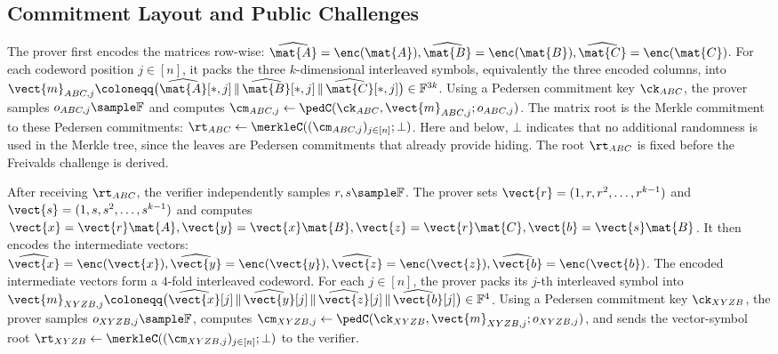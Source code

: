 \subsection{Commitment Layout and Public Challenges}
\label{sec:commitment-challenge}

The prover first encodes the matrices row-wise:
{\footnotesize
\(\widehat{\mat{A}}=\enc(\mat{A}),
  \widehat{\mat{B}}=\enc(\mat{B}),
  \widehat{\mat{C}}=\enc(\mat{C})\).
}
For each codeword position \(j\in[n]\), it packs the three \(k\)-dimensional
interleaved symbols, equivalently the three encoded columns, into
{\footnotesize
\(\vect{m}_{ABC,j}
  \coloneqq
  \big(
    \widehat{\mat{A}}[*,j]\,
    \|\,\widehat{\mat{B}}[*,j]\,
    \|\,\widehat{\mat{C}}[*,j]
  \big)
  \in\mathbb{F}^{3k}\).
}
Using a Pedersen commitment key \(\ck_{ABC}\), the prover samples
\(o_{ABC,j}\sample\mathbb{F}\) and computes
{\footnotesize
\(\cm_{ABC,j}
  \gets
  \pedC(\ck_{ABC},\vect{m}_{ABC,j};o_{ABC,j})\).
}
The matrix root is the Merkle commitment to these Pedersen commitments:
{\footnotesize
\(\rt_{ABC}
  \gets
  \merkleC((\cm_{ABC,j})_{j\in[n]};\bot)\).
}
Here and below, \(\bot\) indicates that no additional randomness is used in the
Merkle tree, since the leaves are Pedersen commitments that already provide
hiding. The root \(\rt_{ABC}\) is fixed before the Freivalds challenge is
derived.

After receiving \(\rt_{ABC}\), the verifier independently samples
\(r,s\sample\mathbb{F}\).  The prover sets
{\footnotesize
\(\vect{r}=(1,r,r^2,\ldots,r^{k-1})\) and
\(\vect{s}=(1,s,s^2,\ldots,s^{k-1})\)}
and computes
{\footnotesize
\(\vect{x}=\vect{r}\mat{A},
  \vect{y}=\vect{x}\mat{B},
  \vect{z}=\vect{r}\mat{C},
  \vect{b}=\vect{s}\mat{B}\).
}
It then encodes the intermediate vectors:
{\footnotesize
\(\widehat{\vect{x}}=\enc(\vect{x}),
  \widehat{\vect{y}}=\enc(\vect{y}),
  \widehat{\vect{z}}=\enc(\vect{z}),
  \widehat{\vect{b}}=\enc(\vect{b})\).
}
The encoded intermediate vectors form a \(4\)-fold interleaved codeword.  For
each \(j\in[n]\), the prover packs its \(j\)-th interleaved symbol into
{\footnotesize
\(\vect{m}_{XYZB,j}
  \coloneqq
  \big(
    \widehat{\vect{x}}[j]\,
    \|\,\widehat{\vect{y}}[j]\,
    \|\,\widehat{\vect{z}}[j]\,
    \|\,\widehat{\vect{b}}[j]
  \big)
  \in\mathbb{F}^{4}\).
}
Using a Pedersen commitment key \(\ck_{XYZB}\), the prover samples
\(o_{XYZB,j}\sample\mathbb{F}\), computes
{\footnotesize
\(\cm_{XYZB,j}
  \gets
  \pedC(\ck_{XYZB},\vect{m}_{XYZB,j};o_{XYZB,j})\),
}
and sends the vector-symbol root
{\footnotesize
\(\rt_{XYZB}
  \gets
  \merkleC((\cm_{XYZB,j})_{j\in[n]};\bot)\)
}
to the verifier.

